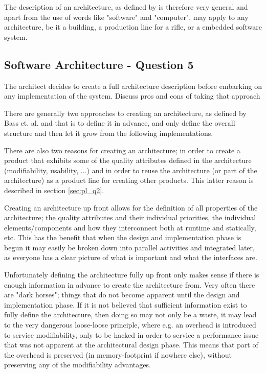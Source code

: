 The description of an architecture, as defined by \cite{bass2003sa} is therefore very general and apart from the use of words like "software" and "computer", may apply to any architecture, be it a building, a production line for a rifle, or a embedded software system.

\subsection{Software Architecture - Question 5}

\begin{question}
The architect decides to create a full architecture
description before embarking on any implementation of the
system. Discuss pros and cons of taking that approach
\end{question}

There are generally two approaches to creating an architecture, as defined by Bass et. al. and that is to define it in advance, and only define the overall structure and then let it grow from the following implementations. 

There are also two reasons for creating an architecture; in order to create a product that exhibits some of the quality attributes defined in the architecture (modifiability, usability, ...) and in order to reuse the architecture (or part of the architecture) as a product line for creating other products. This latter reason is described in section \ref{sec:pl_q2}.

Creating an architecture up front allows for the definition of all properties of the architecture; the quality attributes and their individual priorities, the individual elements/components and how they interconnect both at runtime and statically, etc. This has the benefit that when the design and implementation phase is begun it may easily be broken down into parallel activities and integrated later, as everyone has a clear picture of what is important and what the interfaces are.

Unfortunately defining the architecture fully up front only makes sense if there is enough information in advance to create the architecture from. Very often there are "dark horses"; things that do not become apparent until the design and implementation phase. If it is not believed that sufficient information exist to fully define the architecture, then doing so may not only be a waste, it may lead to the very dangerous loose-loose principle, where e.g. an overhead is introduced to service modifiability, only to be hacked in order to service a performance issue that was not apparent at the architectural design phase. This means that part of the overhead is preserved (in memory-footprint if nowhere else), without preserving any of the modifiability advantages.

